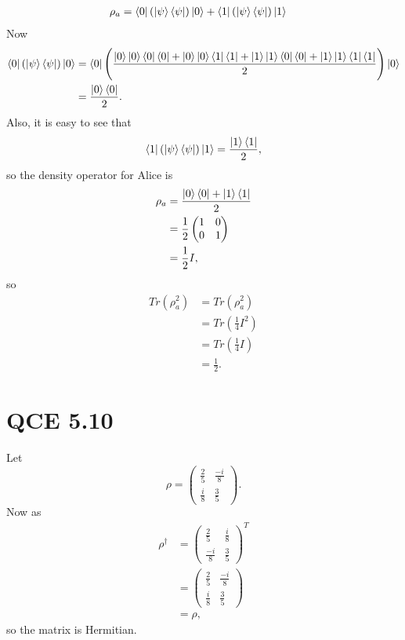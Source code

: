 \documentclass[10pt]{article}
\begin{document}
\begin{align*}
\rho_a &= \bra{0}(\ket{\psi} \bra{\psi})\ket{0} + \bra{1}(\ket{\psi} \bra{\psi})\ket{1}  
\end{align*}
Now
\begin{align*}
\bra{0}(\ket{\psi} \bra{\psi}) \ket{0} &= \bra{0} \Bigg( \frac{ \ket{0}\ket{0} \bra{0} \bra{0} +
		\ket{0}\ket{0} \bra{1} \bra{1} +
		\ket{1}\ket{1} \bra{0} \bra{0} +
		\ket{1}\ket{1} \bra{1} \bra{1}}{2} \Bigg) \ket{0} \\
		&= \frac{\ket{0} \bra{0}}{2}.
\end{align*}
Also, it is easy to see that
\begin{align*}
\bra{1}(\ket{\psi} \bra{\psi}) \ket{1} = \frac{\ket{1}\bra{1}}{2}, 
\end{align*}
so the density operator for Alice is
\begin{align*}
\rho_a &= \frac{\ket{0}\bra{0} + \ket{1}\bra{1}}{2} \\
           &= \frac{1}{2}
           \begin{pmatrix}
		   1 & 0 \\
		   0 & 1           
           \end{pmatrix} \\
           &= \frac{1}{2} I,
\end{align*}
so
\begin{align*}
Tr(\rho_a^2) &= Tr(\rho_a^2) \\
                     &= Tr(\frac{1}{4} I^2) \\
                     &= Tr(\frac{1}{4} I) \\
                     &= \frac{1}{2}.
\end{align*}

\section*{QCE 5.10}
Let
\[
\rho = \begin{pmatrix}
\frac{2}{5} & \frac{-i}{8} \\
\frac{i}{8} & \frac{3}{5}
\end{pmatrix}.
\]
Now as
\begin{align*}
\rho^{\dag} &=
    \begin{pmatrix}
        \frac{2}{5} & \frac{i}{8} \\
        \frac{-i}{8} & \frac{3}{5}
    \end{pmatrix}^T \\
    &= \begin{pmatrix}
        \frac{2}{5} & \frac{-i}{8} \\
        \frac{i}{8} & \frac{3}{5}
    \end{pmatrix} \\
    &= \rho,
\end{align*}
so the matrix is Hermitian.
\end{document}
